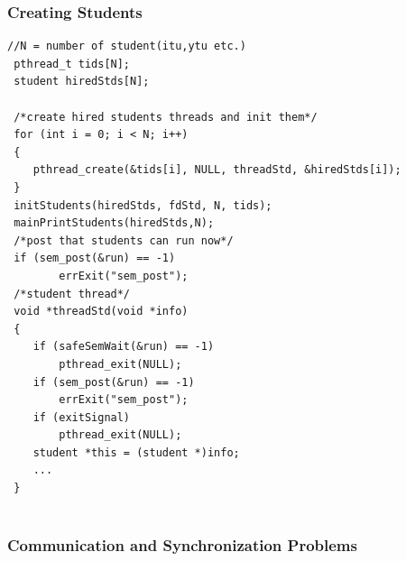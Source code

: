 \documentclass{article}
\begin{document}
\subsubsection*{Creating Students}
\begin{lstlisting}[style=CStyle]
 //N = number of student(itu,ytu etc.)
 pthread_t tids[N];
 student hiredStds[N];
  
 /*create hired students threads and init them*/
 for (int i = 0; i < N; i++)
 {
    pthread_create(&tids[i], NULL, threadStd, &hiredStds[i]);
 }
 initStudents(hiredStds, fdStd, N, tids);
 mainPrintStudents(hiredStds,N);
 /*post that students can run now*/
 if (sem_post(&run) == -1)
        errExit("sem_post");
 /*student thread*/
 void *threadStd(void *info)
 {
    if (safeSemWait(&run) == -1)
        pthread_exit(NULL);
    if (sem_post(&run) == -1)
        errExit("sem_post");
    if (exitSignal)
        pthread_exit(NULL);
    student *this = (student *)info;
    ...
 }
       
\end{lstlisting}

\subsubsection{Communication and Synchronization Problems}
\end{document}
